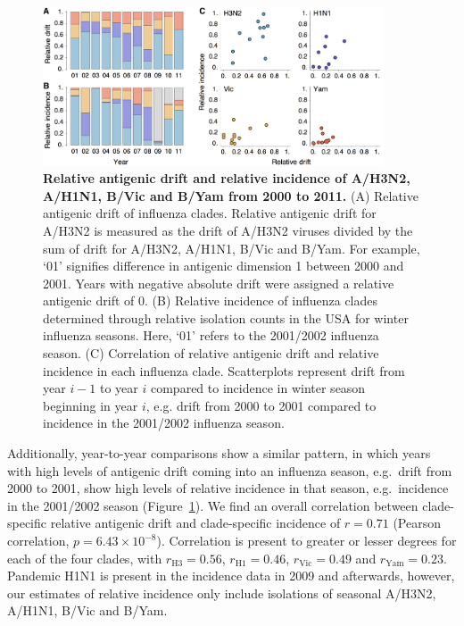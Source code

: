 \documentclass[11pt,oneside,letterpaper]{article}
\begin{document}
\begin{figure}[tb]
	\centering		
	\includegraphics[width=0.9\textwidth]{figures/incidence}
	\caption{\textbf{Relative antigenic drift and relative incidence of A/H3N2, A/H1N1, B/Vic and B/Yam from 2000 to 2011.} 
	(A) Relative antigenic drift of influenza clades.
	Relative antigenic drift for A/H3N2 is measured as the drift of A/H3N2 viruses divided by the sum of drift for A/H3N2, A/H1N1, B/Vic and B/Yam.
	For example, `01' signifies difference in antigenic dimension 1 between 2000 and 2001.
	Years with negative absolute drift were assigned a relative antigenic drift of 0.
	(B) Relative incidence of influenza clades determined through relative isolation counts in the USA for winter influenza seasons.
	Here, `01' refers to the 2001/2002 influenza season.
	(C) Correlation of relative antigenic drift and relative incidence in each influenza clade.
	Scatterplots represent drift from year $i-1$ to year $i$ compared to incidence in winter season beginning in year $i$, e.g. drift from 2000 to 2001 compared to incidence in the 2001/2002 influenza season.
	} 
	\label{incidence} 
\end{figure}

Additionally, year-to-year comparisons show a similar pattern, in which years with high levels of antigenic drift coming into an influenza season, e.g.\ drift from 2000 to 2001, show high levels of relative incidence in that season, e.g.\ incidence in the 2001/2002 season (Figure~\ref{incidence}). 
We find an overall correlation between clade-specific relative antigenic drift and clade-specific incidence of $r = 0.71$ (Pearson correlation, $p = 6.43 \times 10^{-8}$).
Correlation is present to greater or lesser degrees for each of the four clades, with $r_\mathrm{H3} = 0.56$, $r_\mathrm{H1} = 0.46$, $r_\mathrm{Vic} = 0.49$ and $r_\mathrm{Yam} = 0.23$.
Pandemic H1N1 is present in the incidence data in 2009 and afterwards, however, our estimates of relative incidence only include isolations of seasonal A/H3N2, A/H1N1, B/Vic and B/Yam.
\end{document}
